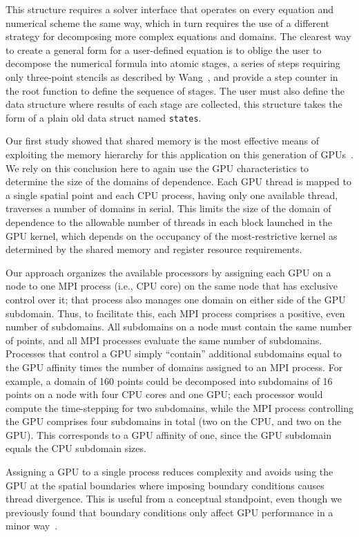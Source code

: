 This structure requires a solver interface that operates on every equation and numerical scheme
the same way, which in turn requires the use of a different strategy for decomposing more complex
equations and domains.
The clearest way to create a general form for a user-defined equation is to oblige the user to decompose
the numerical formula into atomic stages, a series of steps requiring only three-point stencils as described
by Wang~\cite{WangDecomp}, and provide a step counter in the root function to define the sequence of stages.
The user must also define the data structure where results of each stage are collected, this structure takes the form of a plain old data struct named \texttt{states}.

Our first study showed that shared memory is the most effective means of exploiting the memory hierarchy
for this application on this generation of GPUs~\cite{OurJCP}.
We rely on this conclusion here to again use the GPU characteristics to determine the size of the
domains of dependence.
Each GPU thread is mapped to a single spatial point and each CPU process, having only one available thread,
traverses a number of domains in serial.
This limits the size of the domain of dependence to the allowable number of threads in each block launched
in the GPU kernel, which depends on the occupancy of the most-restrictive kernel as determined by the shared
memory and register resource requirements.


Our approach organizes the available processors by assigning each GPU on a node to one
MPI process (i.e., CPU core) on the same node that has exclusive control over it; that process also
manages one domain on either side of the GPU subdomain.
Thus, to facilitate this, each MPI process comprises a positive, even number of subdomains.
All subdomains on a node must contain the same number of points, and all MPI processes evaluate the
same number of subdomains.
Processes that control a GPU simply ``contain'' additional subdomains equal to the GPU affinity times
the number of domains assigned to an MPI process.
For example, a domain of 160 points could be decomposed into subdomains of 16 points on a node with
four CPU cores and one GPU; each processor would compute the time-stepping for two subdomains, while the
MPI process controlling the GPU comprises four subdomains in total (two on the CPU, and two on the GPU).
This corresponds to a GPU affinity of one, since the GPU subdomain equals the CPU subdomain sizes.

Assigning a GPU to a single process reduces complexity and avoids using the GPU at the spatial
boundaries where imposing boundary conditions causes thread divergence.
This is useful from a conceptual standpoint, even though we previously found that boundary
conditions only affect GPU performance in a minor way~\cite{OurJCP}.

